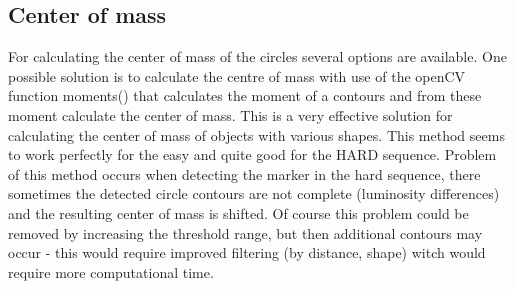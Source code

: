 \subsection{Center of mass}
For calculating the center of mass of the circles several options are available.
One possible solution is to calculate the centre of mass with use of the openCV function
moments() that calculates the moment of a contours and from these moment calculate the
center of mass. This is a very effective solution for calculating the center of mass of
objects with various shapes. This method seems to work perfectly for the easy and quite good
for the HARD sequence. Problem of this method occurs when detecting the marker in the hard sequence,
there sometimes the detected circle contours are not complete (luminosity differences) and the resulting
center of mass is shifted. Of course this problem could be removed by increasing the threshold range, but
then additional contours may occur - this would require improved filtering (by distance, shape) witch would
require more computational time. 



